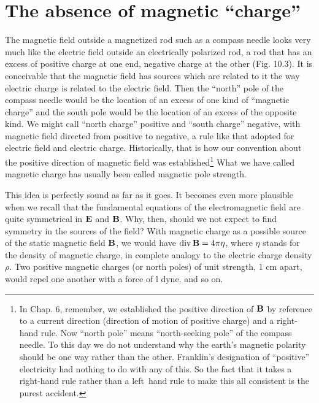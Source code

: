 
\section{The absence of magnetic ``charge''}

The magnetic field outside a magnetized rod such as a compass
needle looks very much like the electric field outside an electrically
polarized rod, a rod that has an excess of positive charge at one end,
negative charge at the other (Fig. 10.3). It is conceivable that the
magnetic field has sources which are related to it the way electric
charge is related to the electric field. Then the ``north'' pole of the
compass needle would be the location of an excess of one kind of
``magnetic charge'' and the south pole would be the location of an
excess of the opposite kind. We might call ``north charge'' positive
and ``south charge'' negative, with magnetic field directed from positive
to negative, a rule like that adopted for electric field and electric
charge. Historically, that is how our convention about the positive
direction of magnetic field was established\footnote{
In Chap. 6, remember, we established the positive direction of $\mathbf{B}$ by reference to a
current direction (direction of motion of positive charge) and a right-hand rule. Now
``north pole'' means ``north-seeking pole'' of the compass needle. To this day we do
not understand why the earth's magnetic polarity should be one way rather than the
other. Franklin's designation of ``positive'' electricity had nothing to do with any of
this. So the fact that it takes a right-hand rule rather than a left~hand rule to make
this all consistent is the purest accident.
} What we have called
magnetic charge has usually been called magnetic pole strength.

This idea is perfectly sound as far as it goes. It becomes even more
plausible when we recall that the fundamental equations of the electromagnetic
field are quite symmetrical in $\mathbf{E}$ and $\mathbf{B}$. Why, then,
should we not expect to find symmetry in the sources of the field?
With magnetic charge as a possible source of the static magnetic
field $\mathbf{B}$, we would have $\operatorname{div}\mathbf{B} = 4\pi\eta$, where $\eta$ stands for the density
of magnetic charge, in complete analogy to the electric charge
density $\rho$. Two positive magnetic charges (or north poles) of unit
strength, 1 cm apart, would repel one another with a force of l dyne,
and so on.

